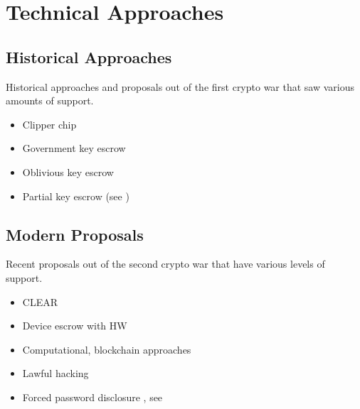 \section{Technical Approaches}

\subsection{Historical Approaches}

Historical approaches and proposals out of the first crypto war that saw various amounts of support.

\begin{itemize}
    \item Clipper chip
    \item Government key escrow
    \item Oblivious key escrow \cite{goos_oblivious_1996}
    \item Partial key escrow (see \cite{denning_taxonomy_1996})
\end{itemize}

\subsection{Modern Proposals}

Recent proposals out of the second crypto war that have various levels of support.

\begin{itemize}
    \item CLEAR \cite{ozzie_2018}
    \item Device escrow with HW \cite{savage_lawful_2018}
    \item Computational, blockchain approaches \cite{phan_key_2017}
    \item Lawful hacking \cite{nguyen_lawful_2017} \cite{soesanto_2018}
    \item Forced password disclosure \cite{bittenbender_2019}, see \cite{kerr_encryption_2017}
\end{itemize}
